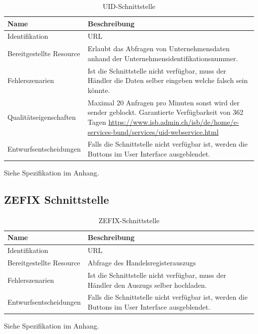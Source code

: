 \begin{table}[H]
	\centering
	\caption{UID-Schnittstelle}
	\begin{tabular}{ | p{4cm} | p{11cm} | }
		\toprule
		{\textbf{Name}} & {\textbf{Beschreibung}} \\
		\midrule
		Identifikation & URL\\ \hline
		Bereitgestellte Resource & Erlaubt das Abfragen von Unternehmensdaten anhand der Unternehmensidentifikationsnummer. \\ \hline
		Fehlerszenarien & Ist die Schnittstelle nicht verfügbar, muss der Händler die Daten selber eingeben welche falsch sein könnte.\\ \hline
		Qualitätseigenschaften & Maximal 20 Anfragen pro Minuten sonst wird der sender geblockt.  Garantierte Verfügbarkeit von 362 Tagen \url{https://www.isb.admin.ch/isb/de/home/e-services-bund/services/uid-webservice.html}\\ \hline
		Entwurfsentscheidungen & Falls die Schnittstelle nicht verfügbar ist, werden die Buttons im User Interface ausgeblendet.\\
		\bottomrule
	\end{tabular}
\end{table}

Siehe Spezifikation im Anhang.

\subsection{ZEFIX Schnittstelle}

\begin{table}[H]
	\centering
	\caption{ZEFIX-Schnittstelle}
	\begin{tabular}{  | p{4cm} | p{11cm} | }
		\toprule
		{\textbf{Name}} & {\textbf{Beschreibung}} \\
		\midrule
		Identifikation & URL\\ \hline
		Bereitgestellte Resource & Abfrage des Handelsregisterauszugs \\ \hline
		Fehlerszenarien & Ist die Schnittstelle nicht verfügbar, muss der Händler den Auszugs selber hochladen.\\ \hline
		Entwurfsentscheidungen & Falls die Schnittstelle nicht verfügbar ist, werden die Buttons im User Interface ausgeblendet.\\
		\bottomrule
	\end{tabular}
\end{table}

Siehe Spezifikation im Anhang.

